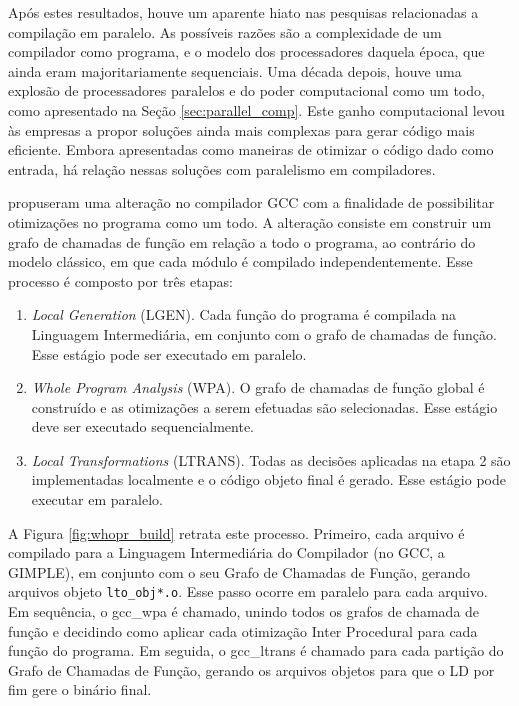 Após estes resultados, houve um aparente hiato nas pesquisas relacionadas a
compilação em paralelo. As possíveis razões são a complexidade de um compilador
como programa, e o modelo dos processadores daquela época, que ainda eram
majoritariamente sequenciais. Uma década depois, houve uma explosão de processadores
paralelos e do poder computacional como um todo, como apresentado na Seção
\ref{sec:parallel_comp}. Este ganho computacional levou às empresas a propor soluções
ainda mais complexas para
gerar código mais eficiente. Embora apresentadas como maneiras de otimizar o código
dado como entrada, há relação nessas soluções com paralelismo em compiladores.

\cite{whoprgoogle} propuseram uma alteração no
compilador GCC com a finalidade
de possibilitar otimizações no programa como um todo. A alteração consiste
em construir um grafo de chamadas de função em relação a todo o programa,
ao contrário do modelo clássico, em que cada módulo é compilado independentemente.
Esse processo é composto por três etapas:
\begin{enumerate}
    \item \textit{Local Generation } (LGEN). Cada função do programa é compilada
        na Linguagem Intermediária, em conjunto com o grafo de chamadas de função.
        Esse estágio pode ser executado em paralelo.

    \item \textit{Whole Program Analysis} (WPA). O grafo de chamadas de função global
        é construído e as otimizações a serem efetuadas são selecionadas. Esse estágio
        deve ser executado sequencialmente.

    \item \textit{Local Transformations} (LTRANS). Todas as decisões aplicadas na
        etapa 2 são implementadas localmente e o código objeto final é gerado.
        Esse estágio pode executar em paralelo.
\end{enumerate}

A Figura \ref{fig:whopr_build} retrata este processo. Primeiro, cada arquivo é
compilado para a Linguagem Intermediária do Compilador (no GCC, a GIMPLE), em
conjunto com o seu Grafo de Chamadas de Função, gerando arquivos objeto
\texttt{lto\_obj*.o}. Esse passo ocorre em paralelo para cada arquivo.
Em sequência, o gcc\_wpa é chamado, unindo todos os grafos
de chamada de função e decidindo como aplicar cada otimização Inter Procedural para
cada função do programa. Em seguida, o gcc\_ltrans é chamado para cada partição do
Grafo de Chamadas de Função, gerando os arquivos objetos para que o LD por
fim gere o binário final.

